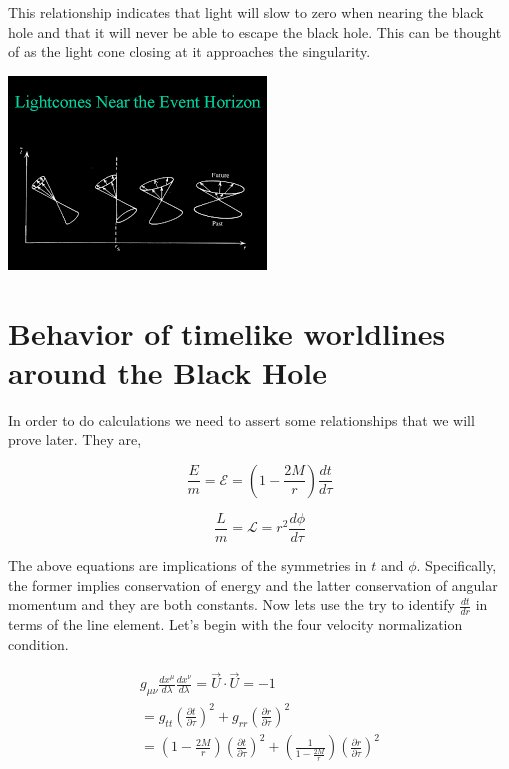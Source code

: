 \documentclass[10pt]{article}
\begin{document}
This relationship indicates that light will slow to zero when nearing the black hole and that it will never be able to escape the black hole. This can be thought of as the light cone closing at it approaches the singularity. 


\includegraphics[scale=.5]{Figures/bh.png} 
\section{Behavior of timelike worldlines around the Black Hole}

In order to do calculations we need to assert some relationships that we will prove later. They are, 

\begin{equation}
\frac{E}{m} = \mathcal{E} = (1 - \frac{2M}{r}) \frac{dt}{d\tau} 
\end{equation}

\begin{equation}
\frac{L}{m} = \mathcal{L} = r^2 \frac{d\phi}{d\tau}
\end{equation}


The above equations are implications of the symmetries in $t$ and $\phi$. Specifically, the former implies conservation of energy and the latter conservation of angular momentum and they are both constants. Now lets use the try to identify $\frac{dt}{dr}$ in terms of the line element. Let's begin with the four velocity normalization condition. 

\begin{equation}
\begin{split}
g_{\mu\nu} \frac{dx^\mu}{d\lambda}  \frac{dx^\nu}{d\lambda} = \vec{U} \cdot \vec{U} = -1 \\
=g_{tt}(\frac{\partial{t}}{\partial{\tau}})^2 +g_{rr}(\frac{\partial{r}}{\partial{\tau}})^2 \\
 = (1- \frac{2M}{r})(\frac{\partial{t}}{\partial{\tau}})^2+(\frac{1}{1-\frac{2M}{r}})(\frac{\partial{r}}{\partial{\tau}})^2 
\end{split}
\end{equation}
\end{document}
